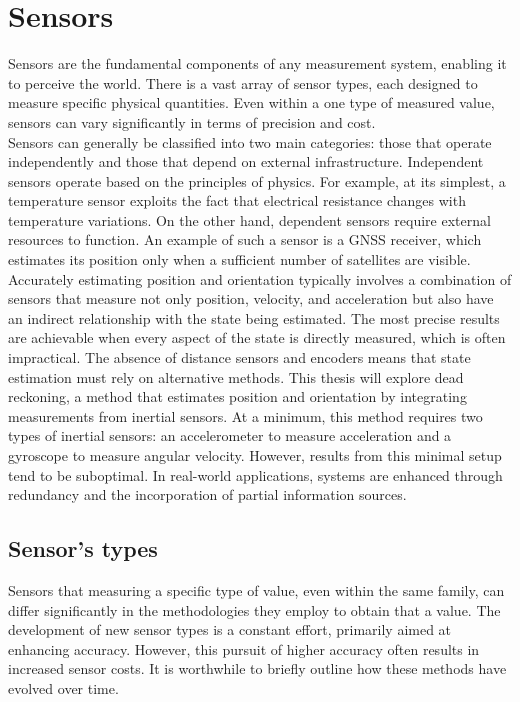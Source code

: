 \chapter{Sensors}

Sensors are the fundamental components of any measurement system, enabling it to perceive the world. There is a vast array of sensor types, each designed to measure specific physical quantities. Even within a one type of measured value, sensors can vary significantly in terms of precision and cost. \\

Sensors can generally be classified into two main categories: those that operate independently and those that depend on external infrastructure. Independent sensors operate based on the principles of physics. For example, at its simplest, a temperature sensor exploits the fact that electrical resistance changes with temperature variations. On the other hand, dependent sensors require external resources to function. An example of such a sensor is a GNSS receiver, which estimates its position only when a sufficient number of satellites are visible.\\

Accurately estimating position and orientation typically involves a combination of sensors that measure not only position, velocity, and acceleration but also have an indirect relationship with the state being estimated. The most precise results are achievable when every aspect of the state is directly measured, which is often impractical. The absence of distance sensors and encoders means that state estimation must rely on alternative methods. This thesis will explore dead reckoning, a method that estimates position and orientation by integrating measurements from inertial sensors. At a minimum, this method requires two types of inertial sensors: an accelerometer to measure acceleration and a gyroscope to measure angular velocity. However, results from this minimal setup tend to be suboptimal. In real-world applications, systems are enhanced through redundancy and the incorporation of partial information sources.

\section{Sensor's types}

Sensors that measuring a specific type of value, even within the same family, can differ significantly in the methodologies they employ to obtain that a value. The development of new sensor types is a constant effort, primarily aimed at enhancing accuracy. However, this pursuit of higher accuracy often results in increased sensor costs. It is worthwhile to briefly outline how these methods have evolved over time.\\

